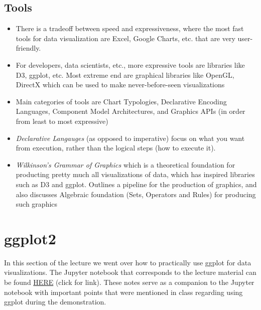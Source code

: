 \subsection{Tools}
\begin{itemize}
  \item There is a tradeoff between speed and expressiveness, where the most fast tools for data visualization are Excel, Google Charts, etc. that are very user-friendly. 
  \item For developers, data scientists, etc., more expressive tools are libraries like D3, ggplot, etc. Most extreme end are graphical libraries like OpenGL, DirectX which can be used to make never-before-seen visualizations
  \item Main categories of tools are Chart Typologies, Declarative Encoding Languages, Component Model Architectures, and Graphics APIs (in order from least to most expressive)
  \item {\it Declarative Langauges} (as opposed to imperative) focus on what you want from execution, rather than the logical steps (how to execute it). 
  \item {\it Wilkinson's Grammar of Graphics} which is a theoretical foundation for producting pretty much all visualizations of data, which has inspired libraries such as D3 and ggplot. Outlines a pipeline for the production of graphics, and also discusses Algebraic foundation (Sets, Operators and Rules) for producing such graphics

\end{itemize}



\section{ggplot2}

In this section of the lecture we went over how to practically use ggplot for data visualizations. The Jupyter notebook that corresponds to the lecture material can be found \href{https://github.com/jhofman/msd2017/blob/master/lectures/lecture_5/visualization_with_ggplot2.ipynb}{HERE} (click for link). These notes serve as a companion to the Jupyter notebook with important points that were mentioned in class regarding using ggplot during the demonstration.

